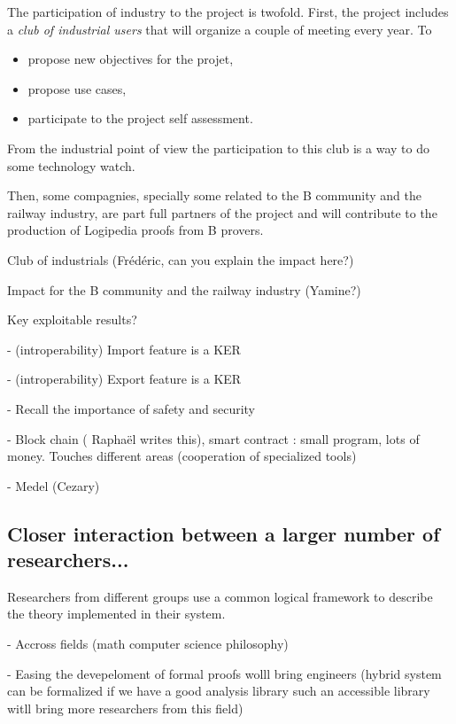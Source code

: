 The participation of industry to the project is twofold. First,
the project includes a {\em club of industrial users} that will
organize a couple of meeting every year. To
\begin{itemize}
\item propose new objectives for the projet,
\item propose use cases,
\item participate to the project self assessment.
\end{itemize}

From the industrial point of view the participation to this club
is a way to do some technology watch. 

Then, some compagnies, specially some related to the {\sc B} community
and the railway industry, are part full partners of the project and
will contribute to the production of {\sc Logipedia} proofs from
{\sc B} provers. 

{\color{red} Club of industrials (Frédéric, can 
you explain the impact here?)}

{\color{red} Impact for the {\sc B} community and the railway industry
  (Yamine?)}

{\color{red} Key exploitable results?}

- (introperability) Import feature is a KER

- (introperability) Export feature is a KER

- Recall the importance of safety and security

- Block chain ({\color{red} Raphaël writes this}), smart contract : small program, lots of money. Touches different areas (cooperation of specialized tools)

- Medel (Cezary)



\subsection{Closer interaction between a larger number of researchers...}


Researchers from different groups use a common logical framework to
describe the theory implemented in their system.

- Accross fields (math computer science philosophy)

- Easing the devepeloment of formal proofs wolll bring engineers
(hybrid system can be formalized if we have a good analysis library
such an accessible library witll bring more researchers from this
field)

